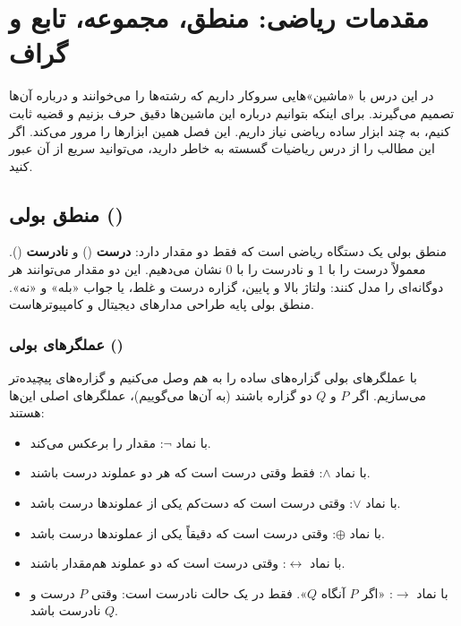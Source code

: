 \chapter{مقدمات ریاضی: منطق، مجموعه، تابع و گراف}

در این درس با «ماشین»هایی سروکار داریم که رشته‌ها را می‌خوانند و درباره آن‌ها تصمیم می‌گیرند. برای اینکه بتوانیم درباره این ماشین‌ها دقیق حرف بزنیم و قضیه ثابت کنیم، به چند ابزار ساده ریاضی نیاز داریم. این فصل همین ابزارها را مرور می‌کند. اگر این مطالب را از درس ریاضیات گسسته به خاطر دارید، می‌توانید سریع از آن عبور کنید.

\section{منطق بولی ()}

منطق بولی یک دستگاه ریاضی است که فقط دو مقدار دارد: \textbf{درست} () و \textbf{نادرست} (). معمولاً درست را با $1$ و نادرست را با $0$ نشان می‌دهیم. این دو مقدار می‌توانند هر دوگانه‌ای را مدل کنند: ولتاژ بالا و پایین، گزاره درست و غلط، یا جواب «بله» و «نه». منطق بولی پایه طراحی مدارهای دیجیتال و کامپیوترهاست.

\subsection{عملگرهای بولی ()}
با عملگرهای بولی گزاره‌های ساده را به هم وصل می‌کنیم و گزاره‌های پیچیده‌تر می‌سازیم. اگر $P$ و $Q$ دو گزاره باشند (به آن‌ها  می‌گوییم)، عملگرهای اصلی این‌ها هستند:
\begin{itemize}
\item {} با نماد $\neg$: مقدار را برعکس می‌کند.
\item {} با نماد $\wedge$: فقط وقتی درست است که هر دو عملوند درست باشند.
\item {} با نماد $\vee$: وقتی درست است که دست‌کم یکی از عملوندها درست باشد.
\item {} با نماد $\oplus$: وقتی درست است که دقیقاً یکی از عملوندها درست باشد.
\item {} با نماد $\leftrightarrow$: وقتی درست است که دو عملوند هم‌مقدار باشند.
\item {} با نماد $\rightarrow$: «اگر $P$ آنگاه $Q$». فقط در یک حالت نادرست است: وقتی $P$ درست و $Q$ نادرست باشد.
\end{itemize}

